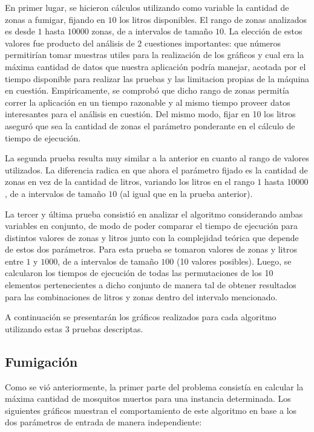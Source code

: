 \documentclass[a4paper,11pt] {article}
\begin{document}
En primer lugar, se hicieron c\'alculos utilizando como variable la cantidad de zonas a fumigar, fijando en $10$ los litros disponibles. El rango de zonas analizados es desde $1$ hasta $10000$ zonas, de a intervalos de tamaño $10$. La elecci\'on de estos valores fue producto del an\'alisis de 2 cuestiones importantes: que n\'umeros permitir\'ian tomar muestras utiles para la realizaci\'on de los gr\'aficos y cual era la m\'axima cantidad de datos que nuestra aplicaci\'on podr\'ia manejar, acotada por el tiempo disponible para realizar las pruebas y las limitacion propias de la m\'aquina en cuesti\'on. Empiricamente, se comprob\'o que dicho rango de zonas permit\'ia correr la aplicaci\'on en un tiempo razonable y al mismo tiempo proveer datos interesantes para el an\'alisis en cuesti\'on. Del mismo modo, fijar en 10 los litros asegur\'o que sea la cantidad de zonas el par\'ametro ponderante en el c\'alculo de tiempo de ejecuci\'on.

La segunda prueba resulta muy similar a la anterior en cuanto al rango de valores utilizados. La diferencia radica en que ahora el par\'ametro fijado es la cantidad de zonas en vez de la cantidad de litros, variando los litros en el rango $1$ hasta $10000$, de a intervalos de tamaño $10$ (al igual que en la prueba anterior).

La tercer y \'ultima prueba consisti\'o en analizar el algoritmo considerando ambas variables en conjunto, de modo de poder comparar el tiempo de ejecuci\'on para distintos valores de zonas y litros junto con la complejidad te\'orica que depende de estos dos par\'ametros. Para esta prueba se tomaron valores de zonas y litros entre $1$ y $1000$, de a intervalos de tamaño $100$ (10 valores posibles). Luego, se calcularon los tiempos de ejecuci\'on de todas las permutaciones de los 10 elementos pertenecientes a dicho conjunto de manera tal de obtener resultados para las combinaciones de litros y zonas dentro del intervalo mencionado.

A continuaci\'on se presentar\'an los gr\'aficos realizados para cada algoritmo utilizando estas 3 pruebas descriptas.

\subsection*{Fumigaci\'on}

Como se vi\'o anteriormente, la primer parte del problema consist\'ia en calcular la m\'axima cantidad de mosquitos muertos para una instancia determinada. Los siguientes gr\'aficos muestran el comportamiento de este algoritmo en base a los dos par\'ametros de entrada de manera independiente:
\end{document}
